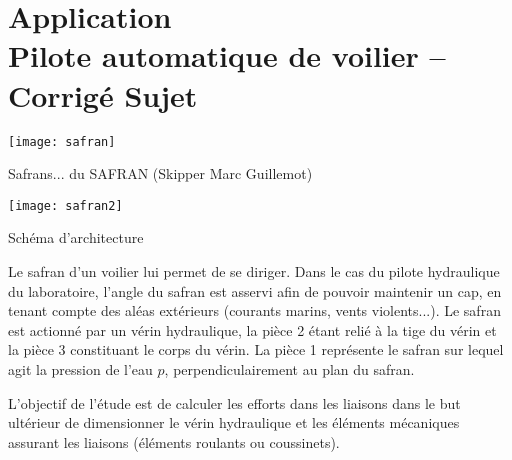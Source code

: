 \chapter*{Application  \\ 
Pilote automatique de voilier -- \ifprof Corrigé \else Sujet \fi}

\iflivret {} \else
\ifprof  {} \else \fi
\fi

\setcounter{question}{0}

\begin{marginfigure}%
\texttt{[image: safran]}

\caption{Safrans... du SAFRAN (Skipper Marc Guillemot)}
\end{marginfigure}

\begin{marginfigure}%
\texttt{[image: safran2]}

\caption{Schéma d'architecture}
\end{marginfigure}




Le safran d'un voilier lui permet de se diriger. Dans le cas du pilote hydraulique du laboratoire, l'angle du safran est asservi afin de pouvoir maintenir un cap, en tenant compte des aléas extérieurs (courants marins, vents violents...). Le safran est actionné par un vérin hydraulique, la pièce 2 étant relié à la tige du vérin et la pièce 3 constituant le corps du vérin. La pièce 1 représente le safran sur lequel agit la pression de l'eau $p$, perpendiculairement au plan du safran. 

L'objectif de l'étude est de calculer les efforts dans les liaisons dans le but ultérieur de dimensionner le vérin hydraulique et les éléments mécaniques assurant les liaisons (éléments roulants ou coussinets). 





